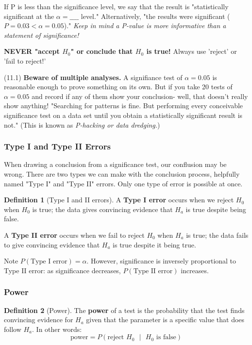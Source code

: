 \documentclass[12pt, a4paper]{article}
\theoremstyle{definition}
\newtheorem{definition}{Definition}
\begin{document}
If P is less than the significance level, we say that the result is "statistically significant at the $\alpha = \_\_\_\_$ level."
Alternatively, "the results were significant ($P = 0.03 < \alpha = 0.05$)."
\textit{Keep in mind a P-value is more informative than a statement of significance!}

\textbf{NEVER "accept $H_0$" or conclude that $H_0$ is true!} Always use 'reject' or 'fail to reject!'

(11.1) \textbf{Beware of multiple analyses.} A signifiance test of $\alpha = 0.05$ is reasonable enough to prove something on its own.
But if you take 20 tests of $\alpha = 0.05$ and record if any of them show your conclusion- well, that doesn't really show anything! "Searching for patterns is fine. But performing every conceivable significance test on a data set until you obtain a statistically significant result is not."
(This is known as \textit{P-hacking or data dredging.})

\subsubsection{Type I and Type II Errors}
When drawing a conclusion from a significance test, our conflusion may be wrong.
There are two types we can make with the conclusion process, helpfully named "Type I" and "Type II" errors. Only one type of error is possible at once.

\begin{definition}[Type I and II errors]
    A \textbf{Type I error} occurs when we reject $H_0$ when $H_0$ is true; the data gives convincing evidence that $H_a$ is true despite being false.
    
    A \textbf{Type II error} occurs when we fail to reject $H_0$ when $H_a$ is true; the data fails to give convincing evidence that $H_a$ is true despite it being true.
\end{definition}

Note $P(\textrm{Type I error}) = \alpha$.
However, significance is inversely proportional to Type II error: as significance decreases, $P(\textrm{Type II error})$ increases.

\subsubsection{Power}
\begin{definition}[Power]
    The \textbf{power} of a test is the probability that the test finds convincing evidence for $H_a$ given that the parameter is a specific value that does follow $H_a$. In other words:
    \[\textrm{power} = P(\textrm{reject $H_0$ $|$ $H_0$ is false})\]
\end{definition}
\end{document}
